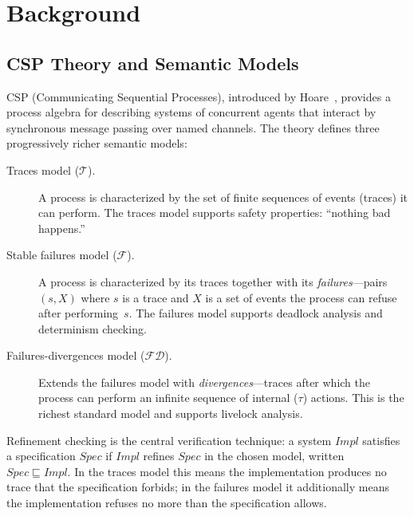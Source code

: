 \documentclass[11pt]{article}
\begin{document}
\section{Background}

\subsection{CSP Theory and Semantic Models}

CSP (Communicating Sequential Processes), introduced by Hoare~\cite{hoare1985},
provides a process algebra for describing systems of concurrent agents
that interact by synchronous message passing over named channels.
The theory defines three progressively richer semantic models:

\begin{description}
\item[Traces model ($\mathcal{T}$).]
  A process is characterized by the set of finite sequences of
  events (traces) it can perform.  The traces model supports
  safety properties: ``nothing bad happens.''

\item[Stable failures model ($\mathcal{F}$).]
  A process is characterized by its traces together with its
  \emph{failures}---pairs $(s, X)$ where $s$ is a trace and $X$ is a
  set of events the process can refuse after performing~$s$.
  The failures model supports deadlock analysis and determinism
  checking.

\item[Failures-divergences model ($\mathcal{FD}$).]
  Extends the failures model with \emph{divergences}---traces after
  which the process can perform an infinite sequence of internal
  ($\tau$) actions.  This is the richest standard model and supports
  livelock analysis.
\end{description}

Refinement checking is the central verification technique: a system
$\mathit{Impl}$ satisfies a specification $\mathit{Spec}$ if
$\mathit{Impl}$ refines $\mathit{Spec}$ in the chosen model, written
$\mathit{Spec} \sqsubseteq \mathit{Impl}$.  In the traces model this
means the implementation produces no trace that the specification
forbids; in the failures model it additionally means the implementation
refuses no more than the specification allows.
\end{document}
